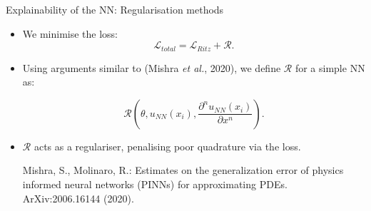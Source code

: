 %
%
\begin{frame}{Explainability of the NN: Regularisation methods}
\centering

\begin{itemize}
\item We  minimise the loss:
$$\mathcal{L}_{total} = \mathcal{L}_{Ritz}+\mathcal{R}.$$
\vspace{0.2cm}

\item Using arguments similar to (Mishra \textit{et al.}, 2020), we define $\mathcal{R}$ for a simple NN as:

\begin{equation*}
\mathcal{R}\left(\theta, u_{NN}(x_i), \dfrac{\partial^{n}u_{NN}(x_i) }{\partial x^{n}} \right).
\end{equation*}


\vspace{0.2cm}
\item $\mathcal{R}$ acts as a regulariser, penalising poor quadrature via the loss. 
%

\vspace{0.5cm}

\begin{thebibliography}{1}
{}Mishra, S., Molinaro, R.: Estimates on the generalization error of physics informed neural
networks (PINNs) for approximating PDEs. ArXiv:2006.16144 (2020).
\end{thebibliography}

\end{itemize}

\end{frame}

